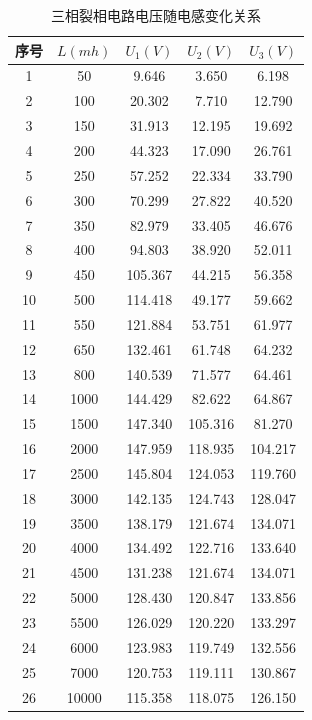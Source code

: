 \documentclass[12pt]{article}%
\begin{document}
\begin{table}[htbp]
  \centering
  \caption{\heiti{}三相裂相电路电压随电感变化关系}
    \begin{tabular}{ccccc}
    \hline
    序号 & $L(mh)$ & $U_1(V)$ & $U_2(V)$ & $U_3(V)$ \\
  \hline
    1  & 50 & 9.646  & 3.650  & 6.198  \\
    2  & 100 & 20.302  & 7.710  & 12.790  \\
    3  & 150 & 31.913  & 12.195  & 19.692  \\
    4  & 200 & 44.323  & 17.090  & 26.761  \\
    5  & 250 & 57.252  & 22.334  & 33.790  \\
    6  & 300 & 70.299  & 27.822  & 40.520  \\
    7  & 350 & 82.979  & 33.405  & 46.676  \\
    8  & 400 & 94.803  & 38.920  & 52.011  \\
    9  & 450 & 105.367  & 44.215  & 56.358  \\
    10 & 500 & 114.418  & 49.177  & 59.662  \\
    11 & 550 & 121.884  & 53.751  & 61.977  \\
    12 & 650 & 132.461  & 61.748  & 64.232  \\
    13 & 800 & 140.539  & 71.577  & 64.461  \\
    14 & 1000 & 144.429  & 82.622  & 64.867  \\
    15 & 1500 & 147.340  & 105.316  & 81.270  \\
    16 & 2000 & 147.959  & 118.935  & 104.217  \\
    17 & 2500 & 145.804  & 124.053  & 119.760  \\
    18 & 3000 & 142.135  & 124.743  & 128.047  \\
    19 & 3500 & 138.179  & 121.674  & 134.071  \\
    20 & 4000 & 134.492  & 122.716  & 133.640  \\
    21 & 4500 & 131.238  & 121.674  & 134.071  \\
    22 & 5000 & 128.430  & 120.847  & 133.856  \\
    23 & 5500 & 126.029  & 120.220  & 133.297  \\
    24 & 6000 & 123.983  & 119.749  & 132.556  \\
    25 & 7000 & 120.753  & 119.111  & 130.867  \\
    26 & 10000 & 115.358  & 118.075  & 126.150  \\
  \hline
    \end{tabular}%
  \label{tab:addlabelaq}%
\end{table}%
\onecolumn
\end{document}
